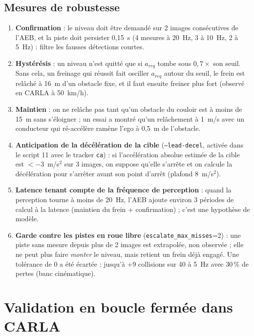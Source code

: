 \documentclass[11pt,a4paper]{article}
\newcommand{\code}[1]{\texttt{#1}}
\begin{document}
\subsection{Mesures de robustesse}
\begin{enumerate}[label=\textbf{\arabic*.}]
\item \textbf{Confirmation} : le niveau doit \^etre demand\'e sur 2 images cons\'ecutives de l'AEB, et la piste doit persister 0,15~s
      (4 mesures \`a 20~Hz, 3 \`a 10~Hz, 2 \`a 5~Hz) : filtre les fausses d\'etections courtes.
\item \textbf{Hyst\'er\'esis} : un niveau n'est quitt\'e que si $a_{req}$ tombe sous $0{,}7\times$ son seuil. Sans cela, un freinage qui r\'eussit fait osciller $a_{req}$ autour du seuil,
      le frein est rel\^ach\'e \`a 16~m d'un obstacle fixe, et il faut ensuite freiner plus fort (observ\'e en CARLA \`a 50~km/h).
\item \textbf{Maintien} : on ne rel\^ache pas tant qu'un obstacle du couloir est \`a moins de 15~m sans s'\'eloigner ; un essai a montr\'e qu'un rel\^achement \`a 1~m/s avec un conducteur
      qui r\'e-acc\'el\`ere ram\`ene l'ego \`a 0,5~m de l'obstacle.
\item \textbf{Anticipation de la d\'ec\'el\'eration de la cible} (\code{--lead-decel}, activ\'ee dans le script 11 avec le tracker \code{ca}) : si l'acc\'el\'eration absolue estim\'ee de la cible est
      $<-3$~m/s$^2$ sur 3 images, on suppose qu'elle s'arr\^ete et on calcule la d\'ec\'el\'eration pour s'arr\^eter avant son point d'arr\^et (plafond 8~m/s$^2$).
\item \textbf{Latence tenant compte de la fr\'equence de perception} : quand la perception tourne \`a moins de 20~Hz, l'AEB ajoute environ 3 p\'eriodes de calcul \`a la latence
      (maintien du frein + confirmation) ; c'est une hypoth\`ese de mod\`ele.
\item \textbf{Garde contre les pistes en roue libre} (\code{escalate\_max\_misses}=2) : une piste sans mesure depuis plus de 2 images est extrapol\'ee, non observ\'ee ;
      elle ne peut plus faire \emph{monter} le niveau, mais retient un frein d\'ej\`a engag\'e. Une tol\'erance de 0 a \'et\'e \'ecart\'ee : jusqu'\`a +9 collisions sur 40 \`a 5~Hz avec 30\,\% de pertes (banc cin\'ematique).
\end{enumerate}

\section{Validation en boucle ferm\'ee dans CARLA}
\end{document}
